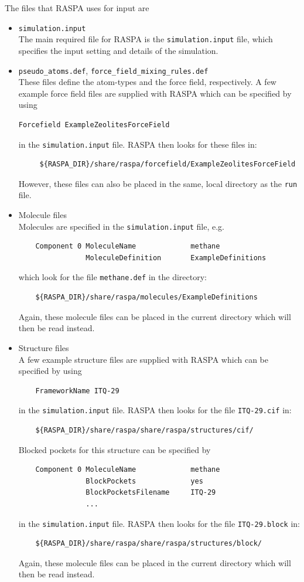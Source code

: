 The files that RASPA uses for input are
\begin{itemize}
\item{\verb+simulation.input+}\\
The main required file for RASPA is the \verb+simulation.input+ file, which specifies the input setting and details of the simulation.
\item{\verb+pseudo_atoms.def+, \verb+force_field_mixing_rules.def+}\\
These files define the atom-types and the force field, respectively.
A few example force field files are supplied with RASPA which can be specified by using
\begin{verbatim}
Forcefield ExampleZeolitesForceField
\end{verbatim}
in the \verb+simulation.input+ file.
RASPA then looks for these files in:
\begin{verbatim}
     ${RASPA_DIR}/share/raspa/forcefield/ExampleZeolitesForceField
\end{verbatim}
However, these files can also be placed in the same, local directory as the \verb+run+ file.
\item{Molecule files}\\
Molecules are specified in the \verb+simulation.input+ file, e.g.\
\begin{verbatim}
    Component 0 MoleculeName             methane
                MoleculeDefinition       ExampleDefinitions
\end{verbatim}
which look for the file \verb+methane.def+ in the directory:
\begin{verbatim}
    ${RASPA_DIR}/share/raspa/molecules/ExampleDefinitions
\end{verbatim}
Again, these molecule files can be placed in the current directory which will then be read instead.
\item{Structure files}\\
A few example structure files are supplied with RASPA which can be specified by using
\begin{verbatim}
    FrameworkName ITQ-29
\end{verbatim}
in the \verb+simulation.input+ file.
RASPA then looks for the file \verb+ITQ-29.cif+ in:
\begin{verbatim}
    ${RASPA_DIR}/share/raspa/share/raspa/structures/cif/
\end{verbatim}
Blocked pockets for this structure can be specified by
\begin{verbatim}
    Component 0 MoleculeName             methane
                BlockPockets             yes
                BlockPocketsFilename     ITQ-29
                ...
\end{verbatim}
in the \verb+simulation.input+ file.
RASPA then looks for the file \verb+ITQ-29.block+ in:
\begin{verbatim}
    ${RASPA_DIR}/share/raspa/share/raspa/structures/block/
\end{verbatim}
Again, these molecule files can be placed in the current directory which will then be read instead.
\end{itemize}


